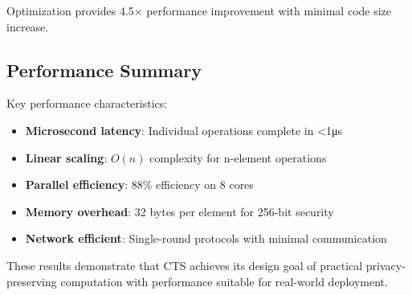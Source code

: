 \documentclass[../main_comprehensive.tex]{subfiles}
\begin{document}
Optimization provides 4.5× performance improvement with minimal code size increase.

\subsection{Performance Summary}

Key performance characteristics:
\begin{itemize}
\item \textbf{Microsecond latency}: Individual operations complete in <1μs
\item \textbf{Linear scaling}: $O(n)$ complexity for n-element operations
\item \textbf{Parallel efficiency}: 88\% efficiency on 8 cores
\item \textbf{Memory overhead}: 32 bytes per element for 256-bit security
\item \textbf{Network efficient}: Single-round protocols with minimal communication
\end{itemize}

These results demonstrate that CTS achieves its design goal of practical privacy-preserving computation with performance suitable for real-world deployment.
\end{document}
